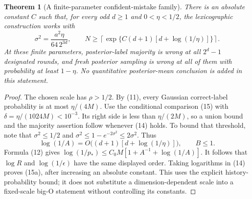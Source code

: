 \documentclass[11pt]{article}
\newtheorem{theorem}{Theorem}
\begin{document}
\begin{theorem}[A finite-parameter confident-mistake family]
There is an absolute constant $C$ such that, for every odd $d\ge1$
and $0<\eta<1/2$, the lexicographic construction works with
\[
 \sigma^2=\frac{a^2\eta}{64\,2^{3d}},\qquad
 N\ge\left\lceil\exp\{C(d+1)[d+\log(1/\eta)]\}\right\rceil.       \tag{15a}
\]
At these finite parameters, posterior-label majority is wrong at all
$2^d-1$ designated rounds, and fresh posterior sampling is wrong at
all of them with probability at least $1-\eta$.
No quantitative posterior-mean conclusion is added in this statement.
\end{theorem}
\begin{proof}
The chosen scale has $\rho>1/2$. By (11), every Gaussian correct-label
probability is at most $\eta/(4M)$. Use the conditional comparison
(15) with $\delta=\eta/(1024M)<10^{-3}$. Its right side is less than
$\eta/(2M)$, so a union bound and the majority assertion follow whenever
(14) holds. To bound that threshold, note that
$\sigma^2\le1/2$ and $\sigma^2\le1-e^{-2\sigma^2}\le2\sigma^2$.
Thus
\[
 \log(1/A)=O\bigl((d+1)[d+\log(1/\eta)]\bigr),\qquad B\le1.
\]
Formula (12) gives
$\log(1/p_*)\le C_0M[1+A^{-1}+\log(1/A)]$.
It follows that $\log R$ and $\log(1/\epsilon)$ have the same displayed
order. Taking logarithms in (14) proves (15a), after increasing an
absolute constant. This uses the explicit history-probability bound;
it does not substitute a dimension-dependent scale into a fixed-scale
big-O statement without controlling its constants.
\end{proof}
\end{document}
